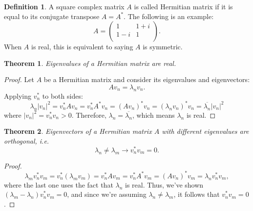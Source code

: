 \documentclass{article}
\newtheorem{theorem}{Theorem}[section]
\theoremstyle{definition}
\newtheorem{definition}{Definition}[section]
\begin{document}
\begin{definition}
A square complex matrix $A$ is called Hermitian matrix if it is equal to its conjugate transpose $A=A^*$. The following is an example:
\begin{equation}
    A =
    \begin{pmatrix}
        1 & 1+i \\
        1-i & 1 \\
    \end{pmatrix}.
\end{equation}
When $A$ is real, this is equivalent to saying $A$ is symmetric.
\end{definition}

\begin{theorem}
Eigenvalues of a Hermitian matrix are real.
\end{theorem}
 
\begin{proof}
Let $A$ be a Hermitian matrix and consider its eigenvalues and eigenvectors:
\begin{equation}
    Av_n=\lambda_nv_n.
\end{equation}
Applying $v_n^*$ to both sides:
\begin{equation}
    \lambda_n |v_n|^2 = v_n^*Av_n = v_n^*A^*v_n = (Av_n)^*v_n = (\lambda_nv_n)^*v_n = \overline{\lambda_n}|v_n|^2
    \label{appendix-eq:eig}
\end{equation}
where $|v_n|^2=v_n^*v_n>0$. Therefore, $\lambda_n=\overline{\lambda_n}$, which means $\lambda_n$ is real.
\end{proof}

\begin{theorem}
Eigenvectors of a Hermitian matrix $A$ with different eigenvalues are orthogonal, i.e.
\begin{equation}
    \lambda_n\ne\lambda_m \to v_n^*v_m=0.
\end{equation}
\end{theorem}

\begin{proof}
\begin{equation}
    \lambda_mv_n^*v_m = v_n^*(\lambda_mv_m) = v_n^*Av_m = v_n^*A^*v_m = (Av_n)^*v_m = \lambda_nv_n^*v_m,
\end{equation}
where the last one uses the fact that $\lambda_n$ is real. Thus, we've shown $(\lambda_m - \lambda_n)v_n^*v_m = 0$, and since we're assuming $\lambda_n\ne\lambda_m$, it follows that $v_n^*v_m=0$.
\end{proof}
\end{document}
